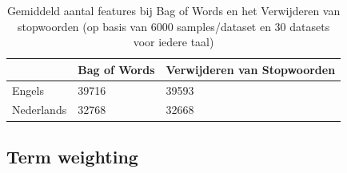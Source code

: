 \begin{table}[h]
\centering
\begin{tabular}{|l|l|l|}
\hline
           & Bag of Words & Verwijderen van Stopwoorden \\ \hline
Engels     &      39716   &           39593             \\ \hline
Nederlands &      32768    &          32668              \\ \hline
\end{tabular}
\caption{Gemiddeld aantal features bij Bag of Words en het Verwijderen van stopwoorden (op basis van 6000 samples/dataset en 30 datasets voor iedere taal)}
\label{tabel: verschil in verwijderde stopwoorden}
\end{table}

\subsection{Term weighting}\label{Term weighting}

